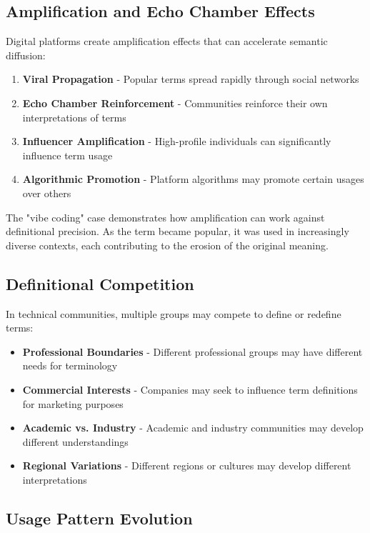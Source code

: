 \documentclass[11pt]{article}
\begin{document}
\subsection{Amplification and Echo Chamber Effects}

Digital platforms create amplification effects that can accelerate semantic diffusion:

\begin{enumerate}
\item \textbf{Viral Propagation} - Popular terms spread rapidly through social networks
\item \textbf{Echo Chamber Reinforcement} - Communities reinforce their own interpretations of terms
\item \textbf{Influencer Amplification} - High-profile individuals can significantly influence term usage
\item \textbf{Algorithmic Promotion} - Platform algorithms may promote certain usages over others
\end{enumerate}

The "vibe coding" case demonstrates how amplification can work against definitional precision. As the term became popular, it was used in increasingly diverse contexts, each contributing to the erosion of the original meaning.

\subsection{Definitional Competition}

In technical communities, multiple groups may compete to define or redefine terms:

\begin{itemize}
\item \textbf{Professional Boundaries} - Different professional groups may have different needs for terminology
\item \textbf{Commercial Interests} - Companies may seek to influence term definitions for marketing purposes
\item \textbf{Academic vs. Industry} - Academic and industry communities may develop different understandings
\item \textbf{Regional Variations} - Different regions or cultures may develop different interpretations
\end{itemize}

\subsection{Usage Pattern Evolution}
\end{document}
